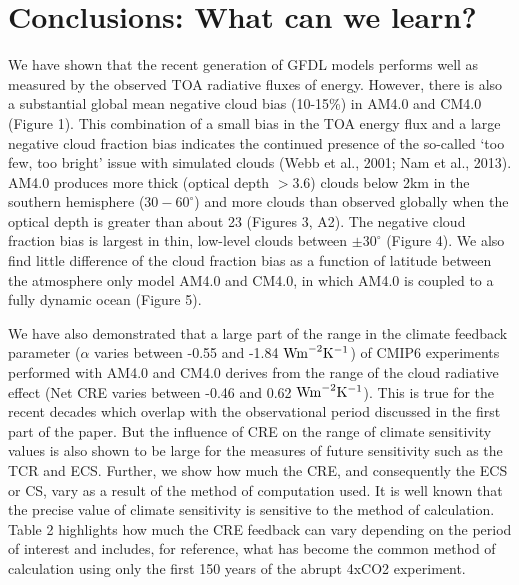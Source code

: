 \documentclass[draft]{agujournal2019}
\begin{document}
\section{Conclusions: What can we learn?}

We have shown that the recent generation of GFDL models performs well as measured by the observed TOA radiative fluxes of energy.
However, there is also a substantial global mean negative cloud bias (10-15\%) in AM4.0 and CM4.0 (Figure 1).  This combination of a small 
bias in the TOA 
energy flux and a large negative cloud fraction bias indicates the continued presence of the so-called `too few, too bright' issue with 
simulated clouds (Webb et al., 2001; Nam et al., 2013).  AM4.0 produces more thick (optical depth $> 3.6$) clouds below 2km in the 
southern hemisphere ($30-60^{\circ}$) and more clouds than observed globally when the optical depth is greater than about 23 (Figures 3, A2).   
The negative cloud fraction bias is largest in thin, low-level clouds between $\pm 30^{\circ}$ (Figure 4).   
We also find little difference of the cloud fraction bias 
as a function of latitude between the atmosphere only model AM4.0 and CM4.0, in which AM4.0 is coupled to a fully dynamic ocean (Figure 5).
 

We have also demonstrated that a large part of the range in the climate feedback parameter ($\alpha$ varies between 
-0.55 and -1.84 $\rm{W m}^{-2} K^{-1}$) of CMIP6 experiments performed with AM4.0 and CM4.0
derives from the range of the cloud radiative effect (Net CRE varies between -0.46 and 0.62 $\rm{W m}^{-2} K^{-1}$).  This is true for the recent decades which overlap with the observational period
discussed in the first part of the paper.  But the influence of CRE on the range of climate sensitivity values is also shown to be large for the 
measures of future sensitivity such as the TCR and ECS.  Further, we show how much the CRE, and consequently the ECS or CS, vary as a result 
of the method of computation used.  
It is well known that the precise value of climate sensitivity is sensitive to the method of calculation.  Table 2 highlights how much the 
CRE feedback can vary depending on the period of interest and includes, for reference, what has become the common method of 
calculation using only the first 150 years of the abrupt 4xCO2 experiment.  
\end{document}
